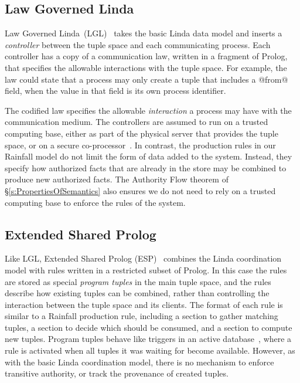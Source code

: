 \subsection{Law Governed Linda}
Law Governed Linda~(LGL)~\cite{Minsky1994:LawGovernedLinda, Minsky2001:SafeTupleSpace} takes the basic Linda data model and inserts a \emph{controller} between the tuple space and each communicating process. Each controller has a copy of a communication law, written in a fragment of Prolog, that specifies the allowable interactions with the tuple space. For example, the law could  state that a process may only create a tuple that includes a @from@ field, when the value in that field is its own process identifier.

The codified law specifies the allowable \emph{interaction} a process may have with the communication medium. The controllers are assumed to run on a trusted computing base, either as part of the physical server that provides the tuple space, or on a secure co-processor~\cite{Minsky2001:SafeTupleSpace}. In contrast, the production rules in our Rainfall model do not limit the form of data added to the system. Instead, they specify how authorized facts that are already in the store may be combined to produce new authorized facts. The Authority Flow theorem of \S\ref{s:PropertiesOfSemantics} also ensures we do not need to rely on a trusted computing base to enforce the rules of the system.


\subsection{Extended Shared Prolog}
\label{s:RelatedESP}
Like LGL, Extended Shared Prolog (ESP)~\cite{Ciancarini1993:Coordinating, Ciancarini1994:LogicTupleSpaces} combines the Linda coordination model with rules written in a restricted subset of Prolog. In this case the rules are stored as special \emph{program tuples} in the main tuple space, and the rules describe how existing tuples can be combined, rather than controlling the interaction between the tuple space and its clients. The format of each rule is similar to a Rainfall production rule, including a section to gather matching tuples, a section to decide which should be consumed, and a section to compute new tuples. Program tuples behave like triggers in an active database~\cite{Paton1999:Active}, where a rule is activated when all tuples it was waiting for become available. However, as with the basic Linda coordination model, there is no mechanism to enforce transitive authority, or track the provenance of created tuples.

